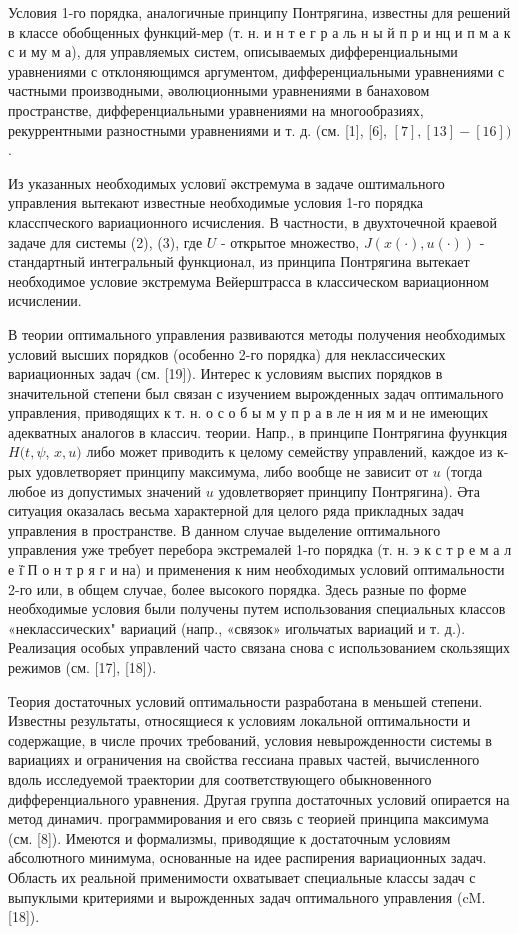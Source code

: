 \documentclass[10pt]{article}
\begin{document}
Условия 1-го порядка, аналогичные принципу Понтрягина, известны для решений в классе обобщенных функций-мер (т. н. и н т е г р а ль н ы й п р и нц и п м а к с и му м а), для управляемых систем, описываемых дифференциальными уравнениями с отклоняющимся аргументом, дифференциальными уравнениями с частными производными, әволюционными уравнениями в банаховом пространстве, дифференциальными уравнениями на многообразиях, рекуррентными разностными уравнениями и т. д. (см. [1], [6], $[7],[13]-[16])$.

Из указанных необходимых условиї әкстремума в задаче оштимального управления вытекают известные необходимые условия 1-го порядка класспческого вариационного исчисления. В частности, в двухточечной краевой задаче для системы (2), (3), где $U$ - открытое множество, $J(x(\cdot), u(\cdot))$ - стандартный интегральный функционал, из принципа Понтрягина вытекает необходимое условие экстремума Вейерштрасса в классическом вариационном исчислении.

В теории оптимального управления развиваются методы получения необходимых условий высших порядков (особенно 2-го порядка) для неклассических вариационных задач (см. [19]). Интерес к условиям выспих порядков в значительной степени был связан с изучением вырожденных задач оптимального управления, приводящих к т. н. о с о б ы м у п р а в ле н ия м и не имеющих адекватных аналогов в классич. теории. Напр., в принципе Понтрягина фуункция $H(t, \psi$, $x, u)$ либо может приводить к целому семейству управлений, каждое из к-рых удовлетворяет принципу максимума, либо вообще не зависит от $u$ (тогда любое из допустимых значений $u$ удовлетворяет принципу Понтрягина). Әта ситуация оказалась весьма характерной для целого ряда прикладных задач управления в пространстве. В данном случае выделение оптимального управления уже требует перебора экстремалей 1-го порядка (т. н. э к с т р е м а л е ї̈ П о н т р я г и на) и применения к ним необходимых условий оптимальности 2-го или, в общем случае, более высокого порядка. Здесь разные по форме необходимые условия были получены путем использования специальных классов «неклассических" вариаций (напр., «связок» игольчатых вариаций и т. д.). Реализация особых управлений часто связана снова с использованием скользящих режимов (см. [17], [18]).

Теория достаточных условий оптимальности разработана в меньшей степени. Известны результаты, относящиеся к условиям локальной оптимальности и содержащие, в числе прочих требований, условия невырожденности системы в вариациях и ограничения на свойства гессиана правых частей, вычисленного вдоль исследуемой траектории для соответствующего обыкновенного дифференциального уравнения. Другая группа достаточных условий опирается на метод динамич. программирования и его связь с теорией принципа максимума (см. [8]). Имеются и формализмы, приводящие к достаточным условиям абсолютного минимума, основанные на идее распирения вариационных задач. Область их реальной применимости охватывает специальные классы задач с выпуклыми критериями и вырожденных задач оптимального управления (cM. [18]).
\end{document}
